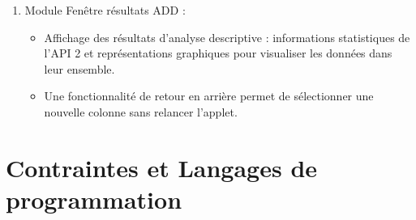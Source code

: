 \begin{description}[style=unboxed,leftmargin=0.2cm]
\begin{enumerate}
					\item Module Fenêtre résultats ADD :
						\begin{itemize}
						\item Affichage des résultats d'analyse descriptive : informations statistiques de l'API 2 et représentations graphiques pour visualiser les données dans leur ensemble.
						\item Une fonctionnalité de retour en arrière permet de sélectionner une nouvelle colonne sans relancer l'applet.
						\end{itemize}
					\end{enumerate}
				
			\end{description}
		
	\section{Contraintes et Langages de programmation}
